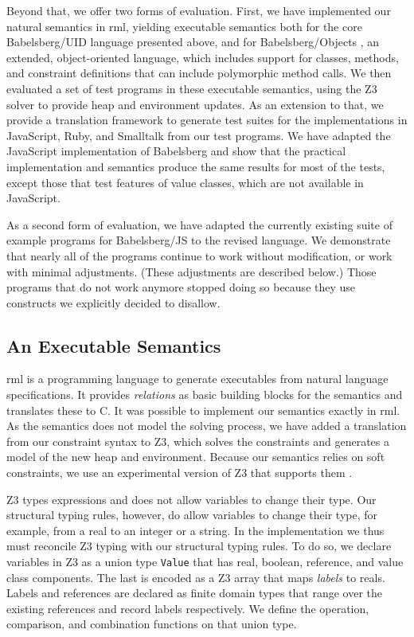 \documentclass[10pt,reprint]{sigplanconf-preprint}
\newcommand{\ac}[1]{\gls*{#1}}
\newcommand{\javascript}{JavaScript\xspace}
\newcommand{\rml}{\ac{rml}\xspace}
\begin{document}
Beyond that, we offer two forms of evaluation.  First, we have
implemented our natural semantics in \rml \cite{pettersson1994rml},
yielding executable semantics both for the core Babelsberg/UID language
presented above, and for Babelsberg/Objects
\cite{felgentreff:2015:semantics}, an extended, object-oriented language,
which includes support for classes, methods, and constraint definitions
that can include polymorphic method calls.  We then evaluated a set of test
programs in these executable semantics, using the Z3 solver
\cite{de2008z3} to provide heap and environment updates. As an
extension to that, we provide a translation framework to generate test
suites for the implementations in \javascript, Ruby, and Smalltalk
from our test programs. We have adapted the \javascript implementation
of Babelsberg and show that the practical implementation and semantics
produce the same results for most of the tests, except those that test
features of value classes, which are not available in \javascript.

As a second form of evaluation, we have adapted the currently existing
suite of example programs for Babelsberg/JS to the revised
language. We demonstrate that nearly all of the programs continue to
work without modification, or work with minimal adjustments.  (These
adjustments are described below.)  Those programs that do not work
anymore stopped doing so because they use constructs we explicitly
decided to disallow.

\subsection{An Executable Semantics}
\label{sec:an-exec-semant}

\rml is a programming language to generate executables from natural
language specifications. It provides \emph{relations} as basic
building blocks for the semantics and translates these to C\@. It was
possible to implement our semantics exactly in \rml.  As the semantics
does not model the solving process, we have added a translation from
our constraint syntax to Z3, which solves the
constraints and generates a model of the new heap and
environment. Because our semantics relies on soft constraints, we
use an experimental version of Z3 that supports them
\cite{bjornernuz}.

Z3 types expressions and does not allow variables to change their
type.  Our structural typing rules, however, do allow variables to change
their type, for example, from a real to an integer or a string. In the
implementation we thus must reconcile Z3 typing with our
structural typing rules. To do so, we declare variables in Z3 as a
union type \verb!Value! that has real, boolean, reference, and value
class components. The last is encoded as a Z3 array that maps
\emph{labels} to reals. Labels and references are declared as finite
domain types that range over the existing references and record labels
respectively. We define the operation, comparison, and combination
functions on that union type.
\end{document}
